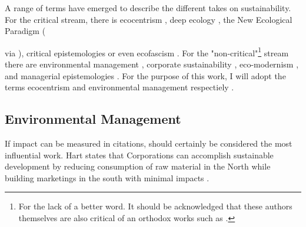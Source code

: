 \documentclass{article}
\begin{document}
	A range of terms have emerged to describe the different takes on sustainability. For the critical stream, there is ecocentrism \citep{Purser1995}, deep ecology \citep{Newton2002}, the New Ecological Paradigm ({\citealp{Catton1980} via \citealp{Hoffman2015}), critical epistemologies \citep{Ergene2020} or even ecofascism \citep{Newton2002}. For the "non-critical"\footnote{For the lack of a better word. It should be acknowledged that these authors themselves are also critical of an orthodox works such as \citet{Friedman1962}.} stream there are environmental management \citep{Purser1995}, corporate sustainability \citep{Hahn2014}, eco-modernism \citep{Springett2003}, and managerial epistemologies \citep{Ergene2020}. For the purpose of this work, I will adopt the terms ecocentrism and environmental management respectiely \citep{Purser1995}.


	\subsection*{Environmental Management}

	If impact can be measured in citations, \citet{Hart1995b} should certainly be considered the most influential work. 
	Hart states that Corporations can accomplish sustainable development by reducing consumption of raw material in the North while building marketings in the south with minimal impacts \citep[p. 998]{Hart1995b}.


}
\end{document}
